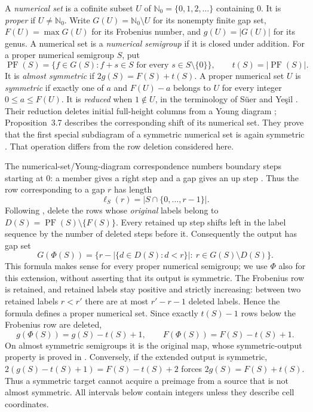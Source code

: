 \documentclass[11pt,a4paper]{article}
\theoremstyle{definition}
\theoremstyle{remark}
\newcommand{\N}{\mathbb{N}_0}
\newcommand{\PF}{\operatorname{PF}}
\begin{document}
A \emph{numerical set} is a cofinite subset $U$ of
$\N=\{0,1,2,\ldots\}$ containing $0$. It is \emph{proper} if $U\ne\N$.
Write $G(U)=\N\setminus U$ for its nonempty finite gap set,
$F(U)=\max G(U)$ for its Frobenius number, and $g(U)=|G(U)|$ for its genus.
A numerical set is a \emph{numerical semigroup} if it is closed under addition.
For a proper numerical semigroup $S$, put
\[
 \PF(S)=\{f\in G(S): f+s\in S\text{ for every }s\in S\setminus\{0\}\},
 \qquad t(S)=|\PF(S)|.
\]
It is \emph{almost symmetric} if $2g(S)=F(S)+t(S)$.
A proper numerical set $U$ is \emph{symmetric} if exactly one of $a$ and
$F(U)-a$ belongs to $U$ for every integer $0\leq a\leq F(U)$.
It is \emph{reduced} when $1\notin U$, in the terminology of
S\"uer and Ye\c{s}il \cite[Definition~3.4 and Proposition~3.5]{SY}.
Their reduction deletes initial full-height columns from a Young diagram
\cite[Definition~3.2]{SY}; Proposition~3.7 describes the corresponding
shift of its numerical set. They prove that the first special subdiagram
of a symmetric numerical set is again symmetric \cite[Proposition~4.1]{SY}.
That operation differs from the row deletion considered here.

The numerical-set/Young-diagram correspondence numbers boundary steps starting
at $0$: a member gives a right step and a gap gives an up step
\cite[Section~2, pp.~4--5]{KN}.
Thus the row corresponding to a gap $r$ has length
\[
 \ell_S(r)=|S\cap\{0,\ldots,r-1\}|.
\]
Following \cite[Theorem~4.2]{DSY}, delete the rows whose \emph{original}
labels belong to $D(S)=\PF(S)\setminus\{F(S)\}$.
Every retained up step shifts left in the label sequence by the number of
deleted steps before it. Consequently the output has gap set
\begin{equation}\label{eq:gaps}
 G(\Phi(S))=
 \bigl\{r-|\{d\in D(S):d<r\}|:\ r\in G(S)\setminus D(S)\bigr\}.
\end{equation}
This formula makes sense for every proper numerical semigroup; we use $\Phi$
also for this extension, without asserting that its output is symmetric.
The Frobenius row is retained, and retained labels stay positive and strictly
increasing: between two retained labels $r<r'$ there are at most $r'-r-1$
deleted labels. Hence the formula defines a proper numerical set.
Since exactly $t(S)-1$ rows below the Frobenius row are deleted,
\begin{equation}\label{eq:shifts}
 g(\Phi(S))=g(S)-t(S)+1,\qquad
 F(\Phi(S))=F(S)-t(S)+1.
\end{equation}
On almost symmetric semigroups it is the original map, whose symmetric-output
property is proved in \cite[Theorem~4.2]{DSY}. Conversely, if the extended
output is symmetric, $2(g(S)-t(S)+1)=F(S)-t(S)+2$ forces
$2g(S)=F(S)+t(S)$. Thus a symmetric target cannot acquire a preimage
from a source that is not almost symmetric.
All intervals below contain integers unless they describe cell coordinates.
\end{document}

